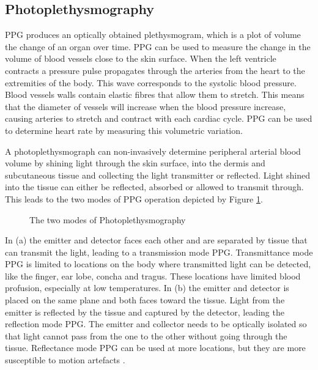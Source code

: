 \subsection{Photoplethysmography}
PPG produces an optically obtained plethysmogram, which is a plot of volume the change of an organ over time. PPG can be used to measure the change in the volume of blood vessels close to the skin surface. When the left ventricle contracts a pressure pulse propagates through the arteries from the heart to the extremities of the body. This wave corresponds to the systolic blood pressure. Blood vessels walls contain elastic fibres that allow them to stretch. This means that the diameter of vessels will increase when the blood pressure increase, causing arteries to stretch and contract with each cardiac cycle. PPG can be used to determine heart rate by measuring this volumetric variation.

\medskip
A photoplethysmograph can non-invasively determine peripheral arterial blood volume by shining light through the skin surface, into the dermis and subcutaneous tissue and collecting the light transmitter or reflected. Light shined into the tissue can either be reflected, absorbed or allowed to transmit through. This leads to the two modes of PPG operation depicted by Figure \ref{fig:PPGModes}.

\medskip
 
\begin{figure}[h]
\centering
\graphicspath{{figs/}}

\caption{The two modes of Photoplethysmography \citep{tamura2014wearable}}
\label{fig:PPGModes}
\end{figure}




In (a) the emitter and detector faces each other and are separated by tissue that can transmit the light, leading to a transmission mode PPG. Transmittance mode PPG is limited to locations on the body where transmitted light can be detected, like the finger, ear lobe, concha and tragus. These locations have limited blood profusion, especially at low temperatures. In (b) the emitter and detector is placed on the same plane and both faces toward the tissue. Light from the emitter is reflected by the tissue and captured by the detector, leading the reflection mode PPG. The emitter and collector needs to be optically isolated so that light cannot pass from the one to the other without going through the tissue. Reflectance mode PPG can be used at more locations, but they are more susceptible to motion artefacts \citep{tamura2014wearable}.

